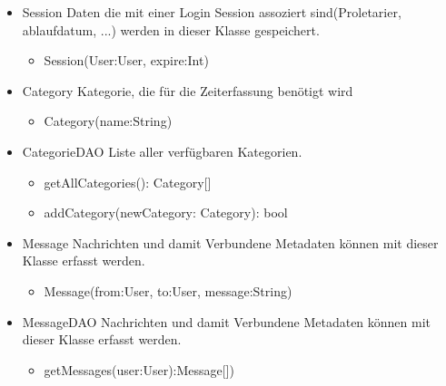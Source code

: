 \begin{itemize}
\begin{itemize}
            \item{Session}
                Daten die mit einer Login Session assoziert sind(Proletarier, ablaufdatum, ...) werden in dieser Klasse gespeichert.
                \begin{itemize}
                    \item{Session(User:User, expire:Int)}
                \end{itemize}

            \item{Category}
                Kategorie, die für die Zeiterfassung benötigt wird
                \begin{itemize}
                    \item{Category(name:String)}
                \end{itemize}

            \item{CategorieDAO}
                Liste aller verfügbaren Kategorien.
                \begin{itemize}
                   \item{getAllCategories(): Category[]}
                   \item{addCategory(newCategory: Category): bool}
                \end{itemize}

            \item{Message}
                Nachrichten und damit Verbundene Metadaten können mit dieser Klasse erfasst werden.
                \begin{itemize}
                    \item{Message(from:User, to:User, message:String)}
                \end{itemize}

            \item{MessageDAO}
                Nachrichten und damit Verbundene Metadaten können mit dieser Klasse erfasst werden.
                \begin{itemize}
                    \item{getMessages(user:User):Message[])}
                \end{itemize}


        \end{itemize}


\end{itemize}
